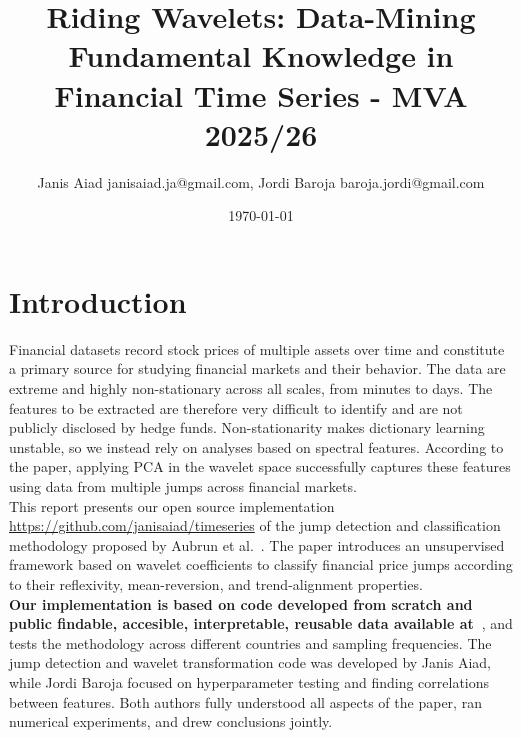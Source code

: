 \documentclass[11pt,a4paper]{article}
\title{Riding Wavelets: Data-Mining Fundamental Knowledge in Financial Time Series - MVA 2025/26}
\author{Janis Aiad janisaiad.ja@gmail.com, Jordi Baroja baroja.jordi@gmail.com}
\date{\today}
\begin{document}
\maketitle




\section{Introduction}



Financial datasets record stock prices of multiple assets over time and constitute a primary source for studying financial markets and their behavior. The data are extreme and highly non-stationary across all scales, from minutes to days. The features to be extracted are therefore very difficult to identify and are not publicly disclosed by hedge funds.
Non-stationarity makes dictionary learning unstable, so we instead rely on analyses based on spectral features. According to the paper, applying PCA in the wavelet space successfully captures these features using data from multiple jumps across financial markets.\\

This report presents our open source implementation \href{https://github.com/janisaiad/timeseries}{https://github.com/janisaiad/timeseries} of the jump detection and classification methodology proposed by Aubrun et al.~\cite{aubrun2024ridingwaveletsmethoddiscover}. The paper introduces an unsupervised framework based on wavelet coefficients to classify financial price jumps according to their reflexivity, mean-reversion, and trend-alignment properties.\\

\textbf{Our implementation is based on code developed from scratch and public findable, accesible, interpretable, reusable data available at~\cite{stooqDB}}, and tests the methodology across different countries and sampling frequencies. The jump detection and wavelet transformation code was developed by Janis Aiad, while Jordi Baroja focused on hyperparameter testing and finding correlations between features. Both authors fully understood all aspects of the paper, ran numerical experiments, and drew conclusions jointly.
\end{document}
